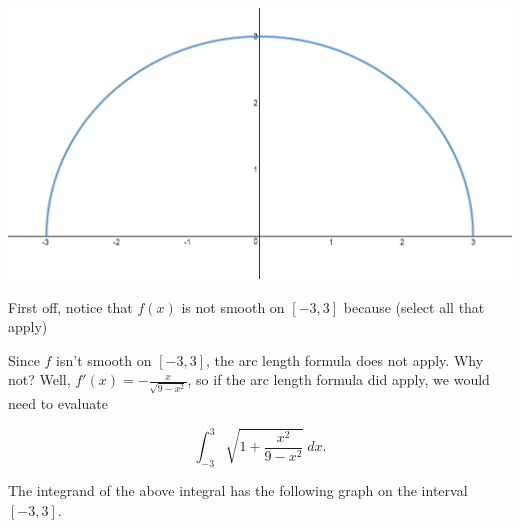 \documentclass[handout,nooutcomes]{ximera}
\begin{document}
\begin{center} \includegraphics{semicircle.png} \end{center}

\begin{problem}
First off, notice that $f(x)$ is not smooth on $[-3,3]$ because (select all that apply)
\begin{selectAll}
\end{selectAll}
\end{problem}

Since $f$ isn't smooth on $[-3,3]$, the arc length formula does not apply.  Why not?  Well, $f'(x) = -\frac{x}{\sqrt{9-x^2}}$, so if the arc length formula did apply, we would need to evaluate

$$\displaystyle\int_{-3}^{3} \sqrt{1+\frac{x^2}{9-x^2}} \ dx.$$

The integrand of the above integral has the following graph on the interval $[-3,3].$  \\
\end{document}
